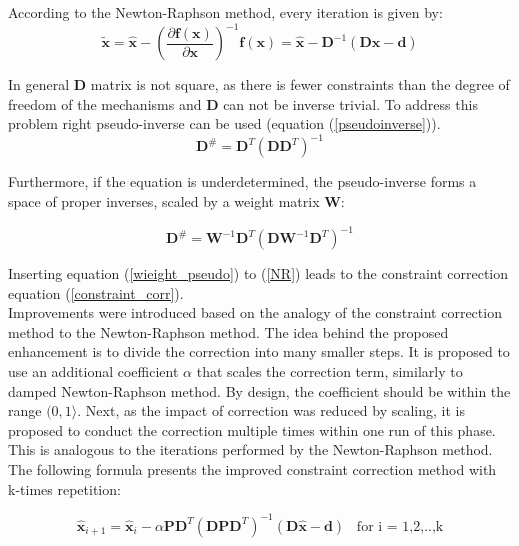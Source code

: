 According to the Newton-Raphson method, every iteration is given by:
\begin{equation}
	\bm{\tilde{x}} = \bm{\hat{x}} - \left( \frac{\partial \bm{f} \left( \bm{x} \right)}{\partial \bm{x}} \right) ^{-1} \bm{f} \left( \bm{x} \right) = \bm{\hat{x}} - \bm{D}^{-1} \left( \bm{D} \bm{\hat{x}} - \bm{d}  \right)
	\label{NR}
\end{equation}

In general $\bm{D}$ matrix is not square, as there is fewer constraints than the degree of freedom of the mechanisms and $\bm{D}$ can not be inverse trivial. To address this problem right pseudo-inverse can be used (equation (\ref{pseudoinverse})).
\begin{equation}
	\bm{D}^{\#} = \bm{D}^T \left( \bm{D} \bm{D}^T \right) ^ {-1}
	\label{pseudoinverse}
\end{equation}

Furthermore, if the equation is underdetermined, the pseudo-inverse forms a space of proper inverses, scaled by a weight matrix $\bm{W}$:

\begin{equation}
	\bm{D}^{\#} = \bm{W}^{-1} \bm{D}^T \left( \bm{D} \bm{W}^{-1} \bm{D}^T \right) ^ {-1}
	\label{wieight_pseudo}
\end{equation}

Inserting equation (\ref{wieight_pseudo}) to (\ref{NR}) leads to the constraint correction equation (\ref{constraint_corr}).\\

Improvements were introduced based on the analogy of the constraint correction method to the Newton-Raphson method. The idea behind the proposed enhancement is to divide the correction into many smaller steps. It is proposed to use an additional coefficient $\alpha$ that scales the correction term, similarly to damped Newton-Raphson method. By design, the coefficient should be within the range $(0, 1 \rangle $. Next, as the impact of correction was reduced by scaling, it is proposed to conduct the correction multiple times within one run of this phase. This is analogous to the iterations performed by the Newton-Raphson method. The following formula presents the improved constraint correction method with k-times repetition:

\begin{equation}
	\bm{\hat{x}}_{i+1} = \bm{\hat{x}}_{i} - \alpha \bm{P} \bm{D}^T \left( \bm{D} \bm{P} \bm{D}^T \right)^{-1} \left( \bm{D} \bm{\hat{x}} - \bm{d}  \right) \hspace{10pt} \text{for i = 1,2,..,k}
	\label{constraint_final}
\end{equation}

